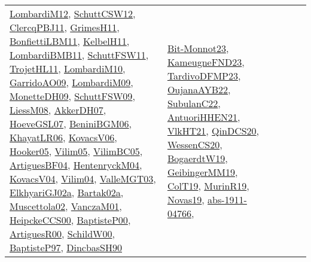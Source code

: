 {\begin{longtable}{lp{3cm}>{\raggedright}p{6cm}>{\raggedright}p{6cm}p{8cm}}
\href{articles/LombardiM12.pdf}{LombardiM12}\cite{LombardiM12}, \href{papers/SchuttCSW12.pdf}{SchuttCSW12}\cite{SchuttCSW12}, \href{papers/ClercqPBJ11.pdf}{ClercqPBJ11}\cite{ClercqPBJ11}, \href{papers/GrimesH11.pdf}{GrimesH11}\cite{GrimesH11}, \href{papers/BonfiettiLBM11.pdf}{BonfiettiLBM11}\cite{BonfiettiLBM11}, \href{articles/KelbelH11.pdf}{KelbelH11}\cite{KelbelH11}, \href{papers/LombardiBMB11.pdf}{LombardiBMB11}\cite{LombardiBMB11}, \href{articles/SchuttFSW11.pdf}{SchuttFSW11}\cite{SchuttFSW11}, \href{articles/TrojetHL11.pdf}{TrojetHL11}\cite{TrojetHL11}, \href{papers/LombardiM10.pdf}{LombardiM10}\cite{LombardiM10}, \href{articles/GarridoAO09.pdf}{GarridoAO09}\cite{GarridoAO09}, \href{papers/LombardiM09.pdf}{LombardiM09}\cite{LombardiM09}, \href{papers/MonetteDH09.pdf}{MonetteDH09}\cite{MonetteDH09}, \href{papers/SchuttFSW09.pdf}{SchuttFSW09}\cite{SchuttFSW09}, \href{articles/LiessM08.pdf}{LiessM08}\cite{LiessM08}, \href{papers/AkkerDH07.pdf}{AkkerDH07}\cite{AkkerDH07}, \href{papers/HoeveGSL07.pdf}{HoeveGSL07}\cite{HoeveGSL07}, \href{papers/BeniniBGM06.pdf}{BeniniBGM06}\cite{BeniniBGM06}, \href{articles/KhayatLR06.pdf}{KhayatLR06}\cite{KhayatLR06}, \href{papers/KovacsV06.pdf}{KovacsV06}\cite{KovacsV06}, \href{articles/Hooker05.pdf}{Hooker05}\cite{Hooker05}, \href{papers/Vilim05.pdf}{Vilim05}\cite{Vilim05}, \href{articles/VilimBC05.pdf}{VilimBC05}\cite{VilimBC05}, \href{papers/ArtiguesBF04.pdf}{ArtiguesBF04}\cite{ArtiguesBF04}, \href{papers/HentenryckM04.pdf}{HentenryckM04}\cite{HentenryckM04}, \href{papers/KovacsV04.pdf}{KovacsV04}\cite{KovacsV04}, \href{papers/Vilim04.pdf}{Vilim04}\cite{Vilim04}, \href{papers/ValleMGT03.pdf}{ValleMGT03}\cite{ValleMGT03}, \href{papers/ElkhyariGJ02a.pdf}{ElkhyariGJ02a}\cite{ElkhyariGJ02a}, \href{papers/Bartak02a.pdf}{Bartak02a}\cite{Bartak02a}, \href{papers/Muscettola02.pdf}{Muscettola02}\cite{Muscettola02}, \href{papers/VanczaM01.pdf}{VanczaM01}\cite{VanczaM01}, \href{articles/HeipckeCCS00.pdf}{HeipckeCCS00}\cite{HeipckeCCS00}, \href{articles/BaptisteP00.pdf}{BaptisteP00}\cite{BaptisteP00}, \href{articles/ArtiguesR00.pdf}{ArtiguesR00}\cite{ArtiguesR00}, \href{articles/SchildW00.pdf}{SchildW00}\cite{SchildW00}, \href{papers/BaptisteP97.pdf}{BaptisteP97}\cite{BaptisteP97}, \href{articles/DincbasSH90.pdf}{DincbasSH90}\cite{DincbasSH90} & \href{papers/Bit-Monnot23.pdf}{Bit-Monnot23}\cite{Bit-Monnot23}, \href{papers/KameugneFND23.pdf}{KameugneFND23}\cite{KameugneFND23}, \href{papers/TardivoDFMP23.pdf}{TardivoDFMP23}\cite{TardivoDFMP23}, \href{papers/OujanaAYB22.pdf}{OujanaAYB22}\cite{OujanaAYB22}, \href{articles/SubulanC22.pdf}{SubulanC22}\cite{SubulanC22}, \href{papers/AntuoriHHEN21.pdf}{AntuoriHHEN21}\cite{AntuoriHHEN21}, \href{articles/VlkHT21.pdf}{VlkHT21}\cite{VlkHT21}, \href{articles/QinDCS20.pdf}{QinDCS20}\cite{QinDCS20}, \href{papers/WessenCS20.pdf}{WessenCS20}\cite{WessenCS20}, \href{papers/BogaerdtW19.pdf}{BogaerdtW19}\cite{BogaerdtW19}, \href{papers/GeibingerMM19.pdf}{GeibingerMM19}\cite{GeibingerMM19}, \href{papers/ColT19.pdf}{ColT19}\cite{ColT19}, \href{papers/MurinR19.pdf}{MurinR19}\cite{MurinR19}, \href{articles/Novas19.pdf}{Novas19}\cite{Novas19}, \href{articles/abs-1911-04766.pdf}{abs-1911-04766}\cite{abs-1911-04766}, 
\end{longtable}}
